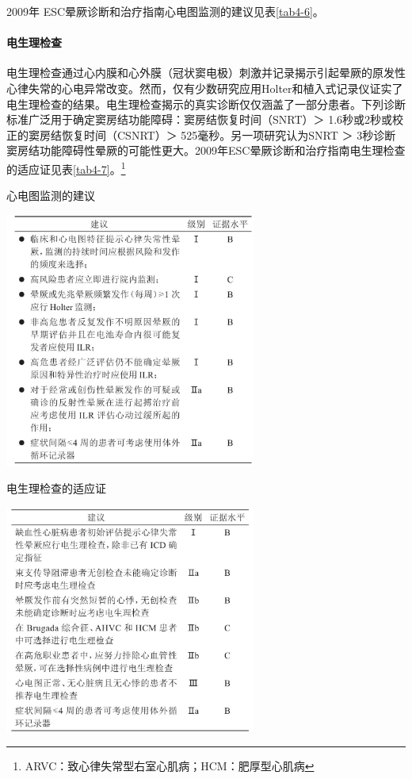 2009年 ESC晕厥诊断和治疗指南心电图监测的建议见表\ref{tab4-6}。

\paragraph{电生理检查}

电生理检查通过心内膜和心外膜（冠状窦电极）刺激并记录揭示引起晕厥的原发性心律失常的心电异常改变。然而，仅有少数研究应用Holter和植入式记录仪证实了电生理检查的结果。电生理检查揭示的真实诊断仅仅涵盖了一部分患者。下列诊断标准广泛用于确定窦房结功能障碍：窦房结恢复时间（SNRT）＞
1.6秒或2秒或校正的窦房结恢复时间（CSNRT）＞ 525毫秒。另一项研究认为SNRT
＞
3秒诊断窦房结功能障碍性晕厥的可能性更大。2009年ESC晕厥诊断和治疗指南电生理检查的适应证见表\ref{tab4-7}。\footnote{ARVC：致心律失常型右室心肌病；HCM：肥厚型心肌病}

\begin{table}[htbp]
\centering
\caption{心电图监测的建议}
\label{tab4-6}
\includegraphics[width=3.25in,height=3.30208in]{./images/Image00023.jpg}
\end{table}

\begin{table}[htbp]
\centering
\caption{电生理检查的适应证}
\label{tab4-7}
\includegraphics[width=3.25in,height=2.9375in]{./images/Image00024.jpg}
\end{table}



